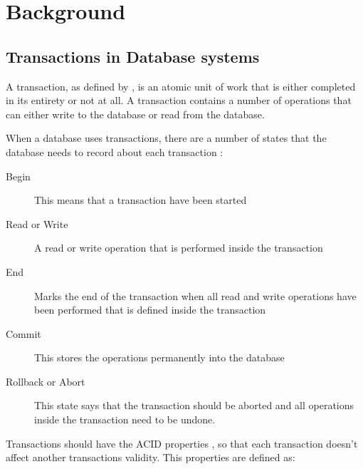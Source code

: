 
\section{Background} %
\label{sec:background}

\subsection{Transactions in Database systems}
\label{sub:db}

A transaction, as defined by \cite[]{Elmasri2004}, is an atomic unit of work that is either completed in its entirety or not at all. A transaction contains a number of operations that can either write to the database or read from the database. 

When a database uses transactions, there are a number of states that the database needs to record about each transaction \cite[]{Elmasri2004}:

\begin{description}
	\item[Begin] This means that a transaction have been started
	\item[Read or Write] A read or write operation that is performed inside the transaction
	\item[End] Marks the end of the transaction when all read and write operations have been performed that is defined inside the transaction
	\item[Commit] This stores the operations permanently into the database 
	\item[Rollback or Abort] This state says that the transaction should be aborted and all operations inside the transaction need to be undone.
\end{description}


Transactions should have the ACID properties \cite[]{Haerder83}, so that each transaction doesn't affect another transactions validity. This properties are defined as:

